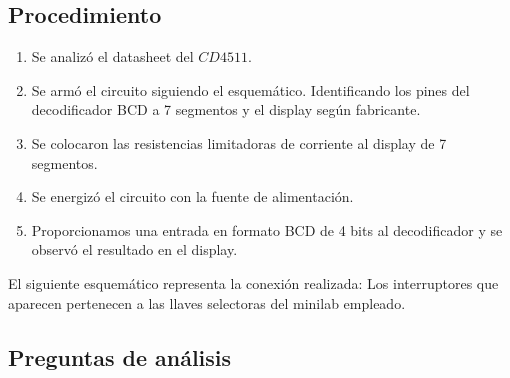 \subsection{Procedimiento}

\begin{enumerate}[nosep]
    \item Se analizó el datasheet del $CD4511$.
    \item Se armó el circuito siguiendo el esquemático. Identificando los pines del decodificador BCD a 7 segmentos y el display según fabricante.
    \item Se colocaron las resistencias limitadoras de corriente al display de 7 segmentos.
    \item Se energizó el circuito con la fuente de alimentación.
    \item Proporcionamos una entrada en formato BCD de 4 bits al decodificador y se observó el resultado en el display.
\end{enumerate}
\newpage
\sangria{} El siguiente esquemático representa la conexión realizada:
\sangria{} Los interruptores que aparecen pertenecen a las llaves selectoras del minilab empleado.

\subsection{Preguntas de análisis}

